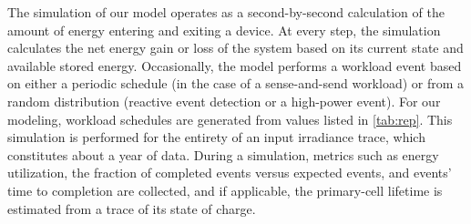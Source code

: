 The simulation of our model operates as a second-by-second calculation of the
amount of energy entering and exiting a device.
At every step, the simulation calculates the net energy gain or loss of the
system based on its current state and available stored energy.  Occasionally,
the model performs a workload event based on either a periodic schedule (in the
case of a sense-and-send workload) or from a random distribution (reactive
event detection or a high-power event). For our modeling, workload schedules
are generated from values listed in \cref{tab:rep}.
This simulation is performed for the entirety of an
input irradiance trace, which constitutes about a year of data. During
a simulation, metrics such as energy utilization, the fraction of completed
events versus expected events, and events' time to completion are collected,
and if applicable, the primary-cell lifetime is estimated from a trace of its
state of charge.

